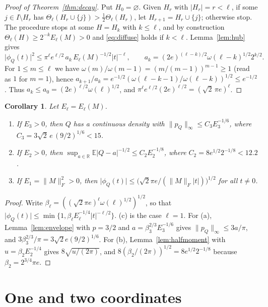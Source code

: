 \documentclass[11pt]{amsart}
\numberwithin{equation}{section}
\newtheorem{corollary}[theorem]{Corollary}
\theoremstyle{definition}
\theoremstyle{remark}
\newcommand{\R}{\mathbb R}
\newcommand{\E}{\mathbb E}
\newcommand{\1}{\mathbf 1}
\newcommand{\norm}[1]{\lVert #1\rVert}
\newcommand{\abs}[1]{\lvert #1\rvert}
\begin{document}
\begin{proof}[Proof of Theorem~\ref{thm:decay}]
Put $H_0=\varnothing$. Given $H_r$ with $\abs{H_r}=r<\ell$, if some $j\in I\setminus H_r$ has $\Theta_\ell(H_r\cup\{j\})>\frac12\Theta_\ell(H_r)$, let $H_{r+1}=H_r\cup\{j\}$; otherwise stop. The procedure stops at some $H=H_k$ with $k\le\ell$, and by construction $\Theta_\ell(H)\ge2^{-k}E_\ell(M)>0$ and \eqref{eq:diffuse} holds if $k<\ell$. Lemma~\ref{lem:hub} gives
\[
\abs{\phi_Q(t)}^2\le\pi^\ell e^{\ell/2}\,a_k\,E_\ell(M)^{-1/2}\abs t^{-\ell},\qquad a_k=(2e)^{(\ell-k)/2}\omega(\ell-k)^{1/2}2^{k/2}.
\]
For $1\le m\le\ell$ we have $\omega(m)/\omega(m-1)=(m/(m-1))^{m-1}\ge1$ (read as $1$ for $m=1$), hence $a_{k+1}/a_k=e^{-1/2}(\omega(\ell-k-1)/\omega(\ell-k))^{1/2}\le e^{-1/2}$. Thus $a_k\le a_0=(2e)^{\ell/2}\omega(\ell)^{1/2}$, and $\pi^\ell e^{\ell/2}(2e)^{\ell/2}=(\sqrt2\,\pi e)^\ell$.
\end{proof}

\begin{corollary}\label{cor:decay}
Let $E_\ell=E_\ell(M)$.
\begin{enumerate}
\item[(a)] If $E_3>0$, then $Q$ has a continuous density with $\norm{p_Q}_\infty\le C_3E_3^{-1/6}$, where $C_3=3\sqrt2\,e\,(9/2)^{1/6}<15$.
\item[(b)] If $E_2>0$, then $\sup_{a\in\R}\E\abs{Q-a}^{-1/2}\le C_2E_2^{-1/8}$, where $C_2=8e^{1/2}2^{-1/8}<12.2$.
\item[(c)] If $E_1=\norm M_F^2>0$, then $\abs{\phi_Q(t)}\le\bigl(\sqrt2\pi e/(\norm M_F\abs t)\bigr)^{1/2}$ for all $t\ne0$.
\end{enumerate}
\end{corollary}

\begin{proof}
Write $\beta_\ell=((\sqrt2\pi e)^\ell \omega(\ell)^{1/2})^{1/2}$, so that $\abs{\phi_Q(t)}\le\min\{1,\beta_\ell E_\ell^{-1/4}\abs t^{-\ell/2}\}$. (c) is the case $\ell=1$. For (a), Lemma~\ref{lem:envelope} with $p=3/2$ and $a=\beta_3^{2/3}E_3^{-1/6}$ gives $\norm{p_Q}_\infty\le3a/\pi$, and $3\beta_3^{2/3}/\pi=3\sqrt2e(9/2)^{1/6}$. For (b), Lemma~\ref{lem:halfmoment} with $u=\beta_2E_2^{-1/4}$ gives $8\sqrt{u/(2\pi)}$, and $8(\beta_2/(2\pi))^{1/2}=8e^{1/2}2^{-1/8}$ because $\beta_2=2^{3/4}\pi e$.
\end{proof}

\section{One and two coordinates}\label{sec:pivots}
\end{document}
